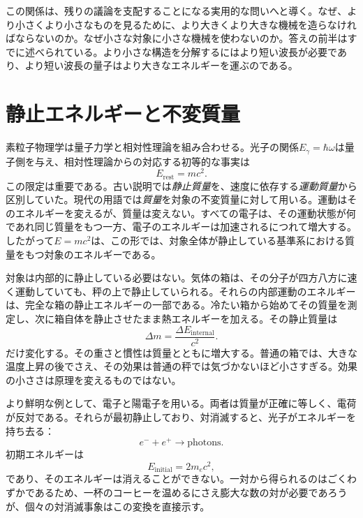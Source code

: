 この関係は、残りの議論を支配することになる実用的な問いへと導く。なぜ、より小さくより小さなものを見るために、より大きくより大きな機械を造らなければならないのか。なぜ小さな対象に小さな機械を使わないのか。答えの前半はすでに述べられている。より小さな構造を分解するにはより短い波長が必要であり、より短い波長の量子はより大きなエネルギーを運ぶのである。

\section{静止エネルギーと不変質量}

素粒子物理学は量子力学と相対性理論を組み合わせる。光子の関係\(E_\gamma=\hbar\omega\)は量子側を与え、相対性理論からの対応する初等的な事実は
\begin{equation}
E_{\mathrm{rest}}=mc^2.
\end{equation}
この限定は重要である。古い説明では\emph{静止質量}を、速度に依存する\emph{運動質量}から区別していた。現代の用語では\emph{質量}を対象の不変質量に対して用いる。運動はそのエネルギーを変えるが、質量は変えない。すべての電子は、その運動状態が何であれ同じ質量をもつ一方、電子のエネルギーは加速されるにつれて増大する。したがって\(E=mc^2\)は、この形では、対象全体が静止している基準系における質量をもつ対象のエネルギーである。

対象は内部的に静止している必要はない。気体の箱は、その分子が四方八方に速く運動していても、秤の上で静止していられる。それらの内部運動のエネルギーは、完全な箱の静止エネルギーの一部である。冷たい箱から始めてその質量を測定し、次に箱自体を静止させたまま熱エネルギーを加える。その静止質量は
\begin{equation}
\Delta m=\frac{\Delta E_{\mathrm{internal}}}{c^2}.
\end{equation}
だけ変化する。その重さと慣性は質量とともに増大する。普通の箱では、大きな温度上昇の後でさえ、その効果は普通の秤では気づかないほど小さすぎる。効果の小ささは原理を変えるものではない。

より鮮明な例として、電子と陽電子を用いる。両者は質量が正確に等しく、電荷が反対である。それらが最初静止しており、対消滅すると、光子がエネルギーを持ち去る：
\begin{equation}
e^-+e^+\longrightarrow \text{photons}.
\end{equation}
初期エネルギーは
\begin{equation}
E_{\mathrm{initial}}=2m_e c^2,
\end{equation}
であり、そのエネルギーは消えることができない。一対から得られるのはごくわずかであるため、一杯のコーヒーを温めるにさえ膨大な数の対が必要であろうが、個々の対消滅事象はこの変換を直接示す。

